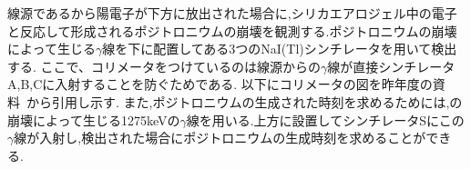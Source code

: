 線源であるから陽電子が下方に放出された場合に,シリカエアロジェル中の電子と反応して形成されるポジトロニウムの崩壊を観測する.ポジトロニウムの崩壊によって生じる$\gamma$線を下に配置してある3つのNaI(Tl)シンチレータを用いて検出する.
ここで、コリメータをつけているのは線源からの$\gamma$線が直接シンチレータA,B,Cに入射することを防ぐためである.
以下にコリメータの図を昨年度の資料~\cite{卒業発表2015}から引用し示す.
また,ポジトロニウムの生成された時刻を求めるためには,の崩壊によって生じる1275keVの$\gamma$線を用いる.上方に設置してシンチレータSにこの$\gamma$線が入射し,検出された場合にポジトロニウムの生成時刻を求めることができる.

